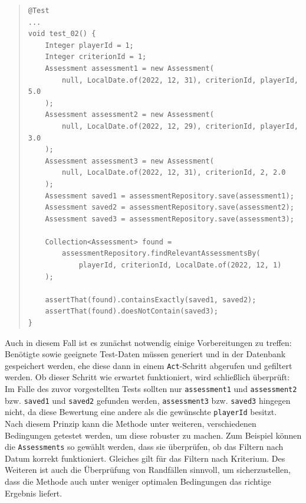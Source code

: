 \begin{quote}
\begin{verbatim}
@Test
...
void test_02() {
    Integer playerId = 1;
    Integer criterionId = 1;
    Assessment assessment1 = new Assessment(
        null, LocalDate.of(2022, 12, 31), criterionId, playerId, 5.0
    );
    Assessment assessment2 = new Assessment(
        null, LocalDate.of(2022, 12, 29), criterionId, playerId, 3.0
    );
    Assessment assessment3 = new Assessment(
        null, LocalDate.of(2022, 12, 31), criterionId, 2, 2.0
    );
    Assessment saved1 = assessmentRepository.save(assessment1);
    Assessment saved2 = assessmentRepository.save(assessment2);
    Assessment saved3 = assessmentRepository.save(assessment3);

    Collection<Assessment> found = 
        assessmentRepository.findRelevantAssessmentsBy(
            playerId, criterionId, LocalDate.of(2022, 12, 1)
    );

    assertThat(found).containsExactly(saved1, saved2);
    assertThat(found).doesNotContain(saved3);
}
\end{verbatim}
\end{quote}

Auch in diesem Fall ist es zunächst notwendig einige Vorbereitungen zu treffen: 
Benötigte sowie geeignete Test-Daten müssen generiert und in der Datenbank gespeichert 
werden, ehe diese dann in einem \texttt{Act}-Schritt abgerufen und gefiltert 
werden. Ob dieser Schritt wie erwartet funktioniert, wird schließlich überprüft: Im 
Falle des zuvor vorgestellten Tests sollten nur \texttt{assessment1} und 
\texttt{assessment2} bzw. \texttt{saved1} und \texttt{saved2} gefunden werden, 
\texttt{assessment3} bzw. \texttt{saved3} hingegen nicht, da diese Bewertung eine 
andere als die gewünschte \texttt{playerId} besitzt. \\ 
Nach diesem Prinzip kann die Methode unter weiteren, verschiedenen Bedingungen 
getestet werden, um diese robuster zu machen. Zum Beispiel können die 
\texttt{Assessments} so gewählt werden, dass sie überprüfen, ob das Filtern nach 
Datum korrekt funktioniert. Gleiches gilt für das Filtern nach Kriterium. Des Weiteren 
ist auch die Überprüfung von Randfällen sinnvoll, um sicherzustellen, dass die 
Methode auch unter weniger optimalen Bedingungen das richtige Ergebnis liefert. 

